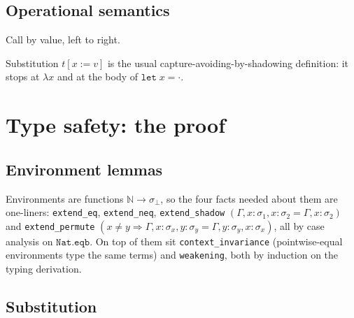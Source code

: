 \documentclass[11pt,a4paper]{article}
\newcommand{\subst}[3]{#1[#2 := #3]}
\newcommand{\step}{\longrightarrow}
\begin{document}
\subsection{Operational semantics}

Call by value, left to right.


Substitution $\subst{t}{x}{v}$ is the usual capture-avoiding-by-shadowing
definition: it stops at $\lambda x$ and at the body of
$\mathtt{let}\;x = \cdot$.

\section{Type safety: the proof}
\label{sec:safe-proof}

\subsection{Environment lemmas}

Environments are functions $\mathbb{N} \to \sigma_\bot$, so the four facts
needed about them are one-liners:
\texttt{extend\_eq}, \texttt{extend\_neq},
\texttt{extend\_shadow} $(\Gamma, x{:}\sigma_1, x{:}\sigma_2 = \Gamma, x{:}\sigma_2)$
and \texttt{extend\_permute} $(x \neq y \Rightarrow \Gamma, x{:}\sigma_x, y{:}\sigma_y
= \Gamma, y{:}\sigma_y, x{:}\sigma_x)$, all by case analysis on
$\mathtt{Nat.eqb}$.  On top of them sit \texttt{context\_invariance}
(pointwise-equal environments type the same terms) and \texttt{weakening},
both by induction on the typing derivation.

\subsection{Substitution}
\end{document}
